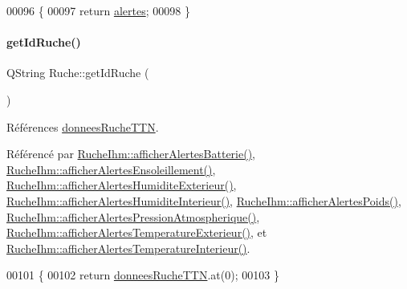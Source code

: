 \begin{DoxyCode}
00096 \{
00097     \textcolor{keywordflow}{return} \hyperlink{class_ruche_af07644ddce44cb5ed4286475dc0f9d46}{alertes};
00098 \}
\end{DoxyCode}
\mbox{\label{class_ruche_a9f2de5ef29557ec7a53d5e22df34d164}} 
\paragraph{\texorpdfstring{get\+Id\+Ruche()}{getIdRuche()}}
{\footnotesize\ttfamily Q\+String Ruche\+::get\+Id\+Ruche (\begin{DoxyParamCaption}{ }\end{DoxyParamCaption})}



Références \hyperlink{class_ruche_a4556832042641c08a6ef2ab9d80d771e}{donnees\+Ruche\+T\+TN}.



Référencé par \hyperlink{class_ruche_ihm_a5181062e21dc73908b660d97e9621fb6}{Ruche\+Ihm\+::afficher\+Alertes\+Batterie()}, \hyperlink{class_ruche_ihm_aea5efc506f9825db2a4eb39a40d7eb18}{Ruche\+Ihm\+::afficher\+Alertes\+Ensoleillement()}, \hyperlink{class_ruche_ihm_a76b73e39e55443fc7b9bb773eac3321f}{Ruche\+Ihm\+::afficher\+Alertes\+Humidite\+Exterieur()}, \hyperlink{class_ruche_ihm_abfe91b271dde97048bb218b04c9e167b}{Ruche\+Ihm\+::afficher\+Alertes\+Humidite\+Interieur()}, \hyperlink{class_ruche_ihm_a641d05346e527c3386ed9df6a7e6fafc}{Ruche\+Ihm\+::afficher\+Alertes\+Poids()}, \hyperlink{class_ruche_ihm_abea08b19d4f52f6767a8618bbc25d956}{Ruche\+Ihm\+::afficher\+Alertes\+Pression\+Atmospherique()}, \hyperlink{class_ruche_ihm_ada4be5a54f7fa57de6190d44e3cfcb82}{Ruche\+Ihm\+::afficher\+Alertes\+Temperature\+Exterieur()}, et \hyperlink{class_ruche_ihm_af4848134f2bc17d9772f2408a068e9d8}{Ruche\+Ihm\+::afficher\+Alertes\+Temperature\+Interieur()}.


\begin{DoxyCode}
00101 \{
00102     \textcolor{keywordflow}{return} \hyperlink{class_ruche_a4556832042641c08a6ef2ab9d80d771e}{donneesRucheTTN}.at(0);
00103 \}
\end{DoxyCode}
\mbox{\label{class_ruche_a509367d6b2bcb7e6431fc1cc5ff606b5}} 
